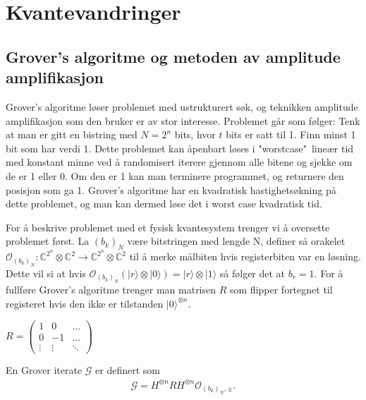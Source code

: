 \section{Kvantevandringer}

\subsection{Grover's algoritme og metoden av amplitude amplifikasjon}

    Grover's algoritme løser problemet med ustrukturert søk, og teknikken amplitude amplifikasjon som den bruker er av stor interesse. Problemet går som følger: Tenk at man er gitt en bistring med $N=2^n$ bits, hvor $t$ bits er satt til 1. Finn minst 1 bit som har verdi 1. Dette problemet kan åpenbart løses i "worstcase"\ lineær tid med konstant minne ved å randomisert iterere gjennom alle bitene og sjekke om de er 1 eller 0. Om den er 1 kan man terminere programmet, og returnere den posisjon som ga 1. Grover's algoritme har en kvadratisk hastighetsøkning på dette problemet, og man kan dermed løse det i worst case kvadratisk tid.

    For å beskrive problemet med et fysisk kvantesystem trenger vi å oversette problemet først. La $(b_k)_N$ være bitstringen med lengde N, definer så orakelet $\mathcal{O}_{(b_k)_N}:\mathbb{C}^{2^n} \otimes \mathbb{C}^2 \rightarrow \mathbb{C}^{2^n} \otimes \mathbb{C}^2$ til å merke målbiten hvis registerbiten var en løsning. Dette vil si at hvis $\mathcal{O}_{(b_k)_N}(|r\rangle\otimes |0\rangle) = |r\rangle\otimes |1\rangle$ så følger det at $b_r = 1$. For å fullføre Grover's algoritme trenger man matrisen $R$ som flipper fortegnet til registeret hvis den ikke er tilstanden $|0\rangle^{\otimes n}$.
    \begin{center}
        \begin{math}
            R = \begin{pmatrix}
                1 & 0 & ... \\
                0 & -1 & ... \\
                \vdots & \vdots & \ddots
            \end{pmatrix}
        \end{math}
    \end{center}

    En Grover iterate $\mathcal{G}$ er definert som 
    \begin{align*}
        \mathcal{G}=H^{\otimes n}RH^{\otimes n}\mathcal{O}_{(b_k)_N, \pm}.
    \end{align*}
    
